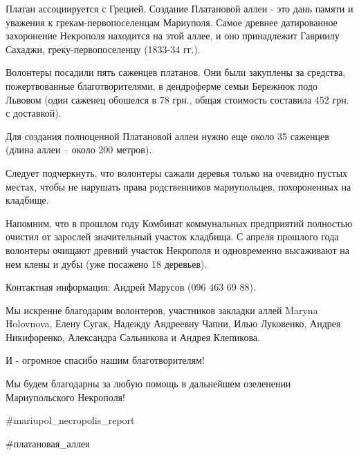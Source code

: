 Платан ассоциируется с Грецией. Создание Платановой аллеи - это дань памяти и
уважения к грекам-первопоселенцам Мариуполя. Самое древнее датированное
захоронение Некрополя находится на этой аллее, и оно принадлежит Гавриилу
Сахаджи, греку-первопоселенцу (1833-34 гг.).

Волонтеры посадили пять саженцев платанов. Они были закуплены за средства,
пожертвованные благотворителями, в дендроферме семьи Бережнюк подо Львовом
(один саженец обошелся в 78 грн., общая стоимость составила 452 грн. с
доставкой).

Для создания полноценной Платановой аллеи нужно еще около 35 саженцев (длина
аллеи – около 200 метров).

Следует подчеркнуть, что волонтеры сажали деревья только на очевидно пустых
местах, чтобы не нарушать права родственников мариупольцев, похороненных на
кладбище.

Напомним, что в прошлом году Комбинат коммунальных предприятий полностью
очистил от зарослей значительный участок кладбища. С апреля прошлого года
волонтеры очищают древний участок Некрополя и одновременно высаживают на нем
клены и дубы (уже посажено 18 деревьев).

Контактная информация: Андрей Марусов (096 463 69 88).

Мы искренне благодарим волонтеров, участников закладки аллей Maryna  Holovnova,
Елену Сугак, Надежду Андреевну Чапни, Илью Луковенко, Андрея Никифоренко,
Александра Сальникова и Андрея Клепикова.

И - огромное спасибо нашим благотворителям!

Мы будем благодарны за любую помощь в дальнейшем озеленении Мариупольского
Некрополя!

\#mariupol\_necropolis\_report

\#платановая\_аллея
